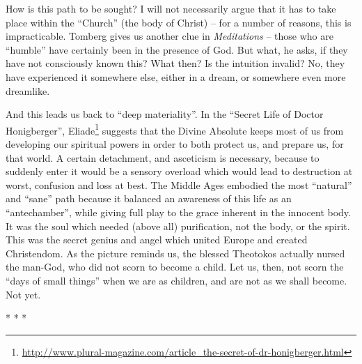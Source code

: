 How is this path to be sought? I will not necessarily argue that it has to take place within the ``Church'' (the body of Christ) -- for a number of reasons, this is impracticable. Tomberg gives us another clue in \emph{Meditations} -- those who are ``humble'' have certainly been in the presence of God. But what, he asks, if they have not consciously known this? What then? Is the intuition invalid? No, they have experienced it somewhere else, either in a dream, or somewhere even more dreamlike.

And this leads us back to ``deep materiality''. In the ``Secret Life of Doctor Honigberger'', Eliade\footnote{\url{http://www.plural-magazine.com/article\_the-secret-of-dr-honigberger.html}} suggests that the Divine Absolute keeps most of us from developing our spiritual powers in order to both protect us, and prepare us, for that world. A certain detachment, and asceticism is necessary, because to suddenly enter it would be a sensory overload which would lead to destruction at worst, confusion and loss at best. The Middle Ages embodied the most ``natural'' and ``sane'' path because it balanced an awareness of this life as an ``antechamber'', while giving full play to the grace inherent in the innocent body. It was the soul which needed (above all) purification, not the body, or the spirit. This was the secret genius and angel which united Europe and created Christendom. As the picture reminds us, the blessed Theotokos actually nursed the man-God, who did not scorn to become a child. Let us, then, not scorn the ``days of small things'' when we are as children, and are not as we shall become. Not yet.



\begin{center}* * *\end{center}

